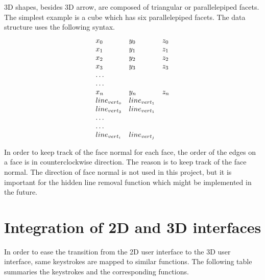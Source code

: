 3D shapes, besides 3D arrow, are composed of triangular or
parallelepiped facets.  The simplest example is a cube which has six 
parallelepiped facets.  The data structure uses the following syntax.
\\

\[
\begin{tt}
\begin{array}{lll}
	x_0 & y_0 & z_0 \\
	x_1 & y_1 & z_1 \\
	x_2 & y_2 & z_2 \\
	x_3 & y_3 & z_3 \\
	\ldots & & \\
	\ldots & & \\
	x_n & y_n & z_n \\
	line_{vert_0} & line_{vert_1} & \\
	line_{vert_3} & line_{vert_1}  &\\
	\ldots & & \\
	\ldots & & \\
	line_{vert_i} & line_{vert_j} & \\
\end{array}
\end{tt}
\]

In order to keep track of the face normal for each face, the order of
the edges on a face is in counterclockwise direction.  The reason is
to keep track of the face normal.  The direction of face normal is not
used in this project, but it is important for the hidden line removal
function which might be implemented in the future.

\section{Integration of 2D and 3D interfaces}

In order to ease the transition from the 2D user interface to the 3D
user interface, same keystrokes are mapped to similar functions.  The
following table summaries the keystrokes and the corresponding
functions. \\

